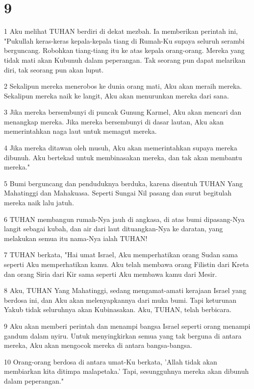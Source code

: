 \chapter{9}

\par 1 Aku melihat TUHAN berdiri di dekat mezbah. Ia memberikan perintah ini, "Pukullah keras-keras kepala-kepala tiang di Rumah-Ku supaya seluruh serambi berguncang. Robohkan tiang-tiang itu ke atas kepala orang-orang. Mereka yang tidak mati akan Kubunuh dalam peperangan. Tak seorang pun dapat melarikan diri, tak seorang pun akan luput.
\par 2 Sekalipun mereka menerobos ke dunia orang mati, Aku akan meraih mereka. Sekalipun mereka naik ke langit, Aku akan menurunkan mereka dari sana.
\par 3 Jika mereka bersembunyi di puncak Gunung Karmel, Aku akan mencari dan menangkap mereka. Jika mereka bersembunyi di dasar lautan, Aku akan memerintahkan naga laut untuk memagut mereka.
\par 4 Jika mereka ditawan oleh musuh, Aku akan memerintahkan supaya mereka dibunuh. Aku bertekad untuk membinasakan mereka, dan tak akan membantu mereka."
\par 5 Bumi berguncang dan penduduknya berduka, karena disentuh TUHAN Yang Mahatinggi dan Mahakuasa. Seperti Sungai Nil pasang dan surut begitulah mereka naik lalu jatuh.
\par 6 TUHAN membangun rumah-Nya jauh di angkasa, di atas bumi dipasang-Nya langit sebagai kubah, dan air dari laut dituangkan-Nya ke daratan, yang melakukan semua itu nama-Nya ialah TUHAN!
\par 7 TUHAN berkata, "Hai umat Israel, Aku memperhatikan orang Sudan sama seperti Aku memperhatikan kamu. Aku telah membawa orang Filistin dari Kreta dan orang Siria dari Kir sama seperti Aku membawa kamu dari Mesir.
\par 8 Aku, TUHAN Yang Mahatinggi, sedang mengamat-amati kerajaan Israel yang berdosa ini, dan Aku akan melenyapkannya dari muka bumi. Tapi keturunan Yakub tidak seluruhnya akan Kubinasakan. Aku, TUHAN, telah berbicara.
\par 9 Aku akan memberi perintah dan menampi bangsa Israel seperti orang menampi gandum dalam nyiru. Untuk menyingkirkan semua yang tak berguna di antara mereka, Aku akan mengocok mereka di antara bangsa-bangsa.
\par 10 Orang-orang berdosa di antara umat-Ku berkata, 'Allah tidak akan membiarkan kita ditimpa malapetaka.' Tapi, sesungguhnya mereka akan dibunuh dalam peperangan."
